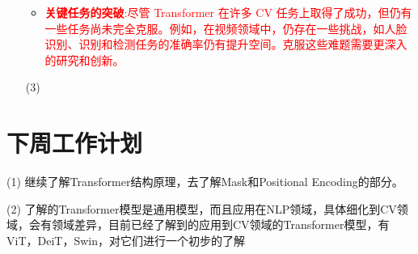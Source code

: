 \documentclass[letterpaper,10pt]{article}
\begin{document}
\begin{itemize}
\begin{itemize}
			\item {}
			\textcolor{red}{\textbf{关键任务的突破}:尽管 Transformer 在许多 CV 任务上取得了成功，但仍有一些任务尚未完全克服。例如，在视频领域中，仍存在一些挑战，如人脸识别、识别和检测任务的准确率仍有提升空间。克服这些难题需要更深入的研究和创新。}
		\end{itemize}	
		
		
		\item [(3)] \textcolor{red}{}
		
	\end{itemize}

	
	\section{下周工作计划}
	
	(1) 继续了解Transformer结构原理，去了解Mask和Positional Encoding的部分。
	
	(2) 了解的Transformer模型是通用模型，而且应用在NLP领域，具体细化到CV领域，会有领域差异，目前已经了解到的应用到CV领域的Transformer模型，有ViT，DeiT，Swin，对它们进行一个初步的了解
	
	
	
\end{document}
